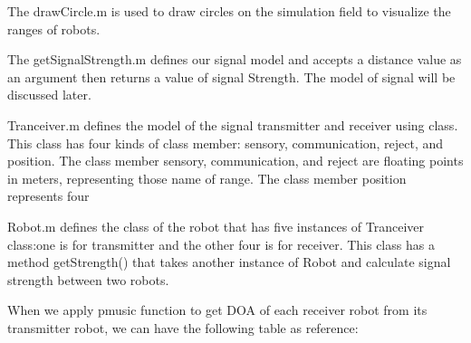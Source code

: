 The drawCircle.m is used to draw circles on the simulation field to visualize the ranges of robots.

The getSignalStrength.m defines our signal model and accepts a distance value as an argument then returns a value of signal Strength. The model of signal will be discussed later.

Tranceiver.m defines the model of the signal transmitter and receiver using class. This class has four kinds of class member: sensory, communication, reject, and position. The class member sensory, communication, and reject are floating points in meters, representing those name of range. The class member position represents four 

Robot.m defines the class of the robot that has five instances of Tranceiver class:one is for transmitter and the other four is for receiver. This class has a method getStrength() that takes another instance of Robot and calculate signal strength between two robots. 

When we apply pmusic function to get DOA of each receiver robot from its transmitter robot, we can have the following table as reference:

\begin{table}[]
\centering
\label{Sample DOA data table}
\caption{Numbers are DOA represented as degrees. 0 means robot is receive its own signal.}
\end{table}

